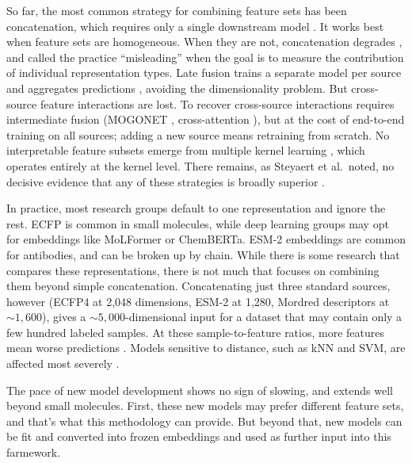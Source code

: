 So far, the most common strategy for combining feature sets has been concatenation, which requires only a single downstream model \citep{Stahlschmidt2022}. It works best when feature sets are homogeneous. When they are not, concatenation degrades \citep{Stahlschmidt2022}, and \cite{Deng2023} called the practice ``misleading'' when the goal is to measure the contribution of individual representation types. Late fusion trains a separate model per source and aggregates predictions \citep{Steyaert2023}, avoiding the dimensionality problem. But cross-source feature interactions are lost. To recover cross-source interactions requires intermediate fusion (MOGONET \citep{Wang2021}, cross-attention \citep{Zhang2024}), but at the cost of end-to-end training on all sources; adding a new source means retraining from scratch. No interpretable feature subsets emerge from multiple kernel learning \citep{Gonen2011}, which operates entirely at the kernel level. There remains, as Steyaert et al.\ noted, no decisive evidence that any of these strategies is broadly superior \citep{Steyaert2023}.

In practice, most research groups default to one representation and ignore the rest. ECFP is common in small molecules, while deep learning groups may opt for embeddings like MoLFormer or ChemBERTa. ESM-2 embeddings are common for antibodies, and can be broken up by chain. While there is some research that compares these representations, there is not much that focuses on combining them beyond simple concatenation. Concatenating just three standard sources, however (ECFP4 at 2,048 dimensions, ESM-2 at 1,280, Mordred descriptors at ${\sim}1{,}600$), gives a ${\sim}5{,}000$-dimensional input for a dataset that may contain only a few hundred labeled samples. At these sample-to-feature ratios, more features mean worse predictions \citep{Hughes1968, Bellman1961}. Models sensitive to distance, such as kNN and SVM, are affected most severely \citep{FernandezDelgado2014}.

The pace of new model development shows no sign of slowing, and extends well beyond small molecules. First, these new models may prefer different feature sets, and that's what this methodology can provide. But beyond that, new models can be fit and converted into frozen embeddings and used as further input into this farmework. 

